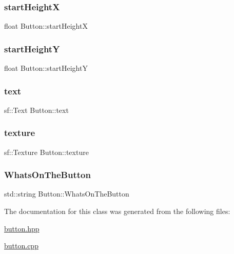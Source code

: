 \subsubsection{\texorpdfstring{start\+HeightX}{startHeightX}}
{\footnotesize\ttfamily float Button\+::start\+HeightX\hspace{0.3cm}{\ttfamily [private]}}

\mbox{\label{class_button_afe532ea0d5dd3fea5341ba1cb3e64e0b}} 
\subsubsection{\texorpdfstring{start\+HeightY}{startHeightY}}
{\footnotesize\ttfamily float Button\+::start\+HeightY\hspace{0.3cm}{\ttfamily [private]}}

\mbox{\label{class_button_aadf908b0777f2ae5c28d949fda3384c1}} 
\subsubsection{\texorpdfstring{text}{text}}
{\footnotesize\ttfamily sf\+::\+Text Button\+::text\hspace{0.3cm}{\ttfamily [private]}}

\mbox{\label{class_button_aa0cf48f8db00201090fbbd702ee81fb9}} 
\subsubsection{\texorpdfstring{texture}{texture}}
{\footnotesize\ttfamily sf\+::\+Texture Button\+::texture\hspace{0.3cm}{\ttfamily [private]}}

\mbox{\label{class_button_a960b5ee6c11f9385763838b1d788f010}} 
\subsubsection{\texorpdfstring{Whats\+On\+The\+Button}{WhatsOnTheButton}}
{\footnotesize\ttfamily std\+::string Button\+::\+Whats\+On\+The\+Button\hspace{0.3cm}{\ttfamily [private]}}



The documentation for this class was generated from the following files\+:\begin{DoxyCompactItemize}
\item 
\hyperlink{button_8hpp}{button.\+hpp}\item 
\hyperlink{button_8cpp}{button.\+cpp}\end{DoxyCompactItemize}
